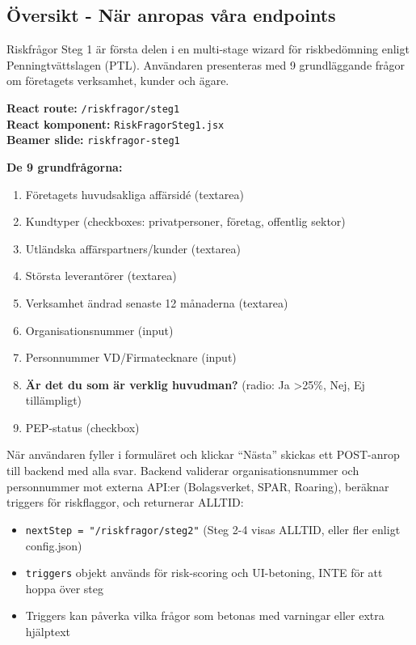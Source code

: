 \documentclass[12pt,a4paper]{article}
\begin{document}
\subsection{Översikt - När anropas våra endpoints}

Riskfrågor Steg 1 är första delen i en multi-stage wizard för riskbedömning enligt Penningtvättslagen (PTL). Användaren presenteras med 9 grundläggande frågor om företagets verksamhet, kunder och ägare.

\textbf{React route:} \texttt{/riskfragor/steg1}\\
\textbf{React komponent:} \texttt{RiskFragorSteg1.jsx}\\
\textbf{Beamer slide:} \texttt{riskfragor-steg1}

\textbf{De 9 grundfrågorna:}
\begin{enumerate}[noitemsep]
  \item Företagets huvudsakliga affärsidé (textarea)
  \item Kundtyper (checkboxes: privatpersoner, företag, offentlig sektor)
  \item Utländska affärspartners/kunder (textarea)
  \item Största leverantörer (textarea)
  \item Verksamhet ändrad senaste 12 månaderna (textarea)
  \item Organisationsnummer (input)
  \item Personnummer VD/Firmatecknare (input)
  \item \textbf{Är det du som är verklig huvudman?} (radio: Ja >25\%, Nej, Ej tillämpligt)
  \item PEP-status (checkbox)
\end{enumerate}

När användaren fyller i formuläret och klickar \enquote{Nästa} skickas ett POST-anrop till backend med alla svar. Backend validerar organisationsnummer och personnummer mot externa API:er (Bolagsverket, SPAR, Roaring), beräknar triggers för riskflaggor, och returnerar ALLTID:
\begin{itemize}[noitemsep]
  \item \texttt{nextStep = "/riskfragor/steg2"} (Steg 2-4 visas ALLTID, eller fler enligt config.json)
  \item \texttt{triggers} objekt används för risk-scoring och UI-betoning, INTE för att hoppa över steg
  \item Triggers kan påverka vilka frågor som betonas med varningar eller extra hjälptext
\end{itemize}
\end{document}
